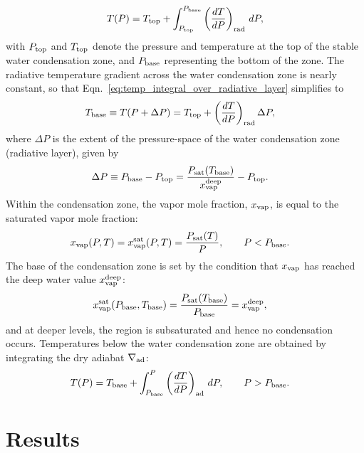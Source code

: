 \documentclass[11pt]{ucscthesisbs}
\begin{document}
\begin{equation}
  T(P) = T_{\rm top} + \int_{P_{\rm top}}^{P_{\rm base}} \left(\frac{dT}{dP}\right)_{\rm rad}\,d P ,
  \label{eq:temp_integral_over_radiative_layer}
\end{equation}
with $P_{\rm top}$ and $T_{\rm top}$ denote the pressure and temperature at the top of the stable water condensation zone, and $P_{\rm base}$ representing the bottom of the zone. The radiative temperature gradient across the water condensation zone is nearly constant, so that Eqn.~\ref{eq:temp_integral_over_radiative_layer} simplifies to
\begin{align}
T_{\rm base}\equiv T(P+\Delta P) &= T_{\rm top} + \left(\frac{dT}{dP}\right)_{\rm rad}\Delta P ,
\label{eq:temperature_profile_over_radiative_layer_simplification}
\end{align}
where $\Delta P$ is the extent of the pressure-space of the water condensation zone (radiative layer), given by
\begin{align}
\Delta P \equiv P_{\rm base}-P_{\rm top} &= \frac{P_{\rm sat}(T_{\rm base})}{x_{\rm vap}^{\rm deep}} - P_{\rm top}.
\label{eq:delta_P_over_radiative_layer}
\end{align}
Within the condensation zone, the vapor mole fraction, $x_{\rm vap}$, is equal to the saturated vapor mole fraction:
\begin{align}
x_{\rm vap}(P, T) &= x_{\rm vap}^{\rm sat}(P, T) = \frac{P_{\rm sat}(T)}{P}, \qquad P<P_{\rm base}.
\label{eq:vapor_mole_fraction_within_condensation_zone}
\end{align}
The base of the condensation zone is set by the condition that $x_{\rm vap}$ has reached the deep water value $x_{\rm vap}^{\rm deep}$:
\begin{align}
x_{\rm vap}^{\rm sat}(P_{\rm base}, T_{\rm base}) &= \frac{P_{\rm sat}(T_{\rm base})}{P_{\rm base}}=x_{\rm vap}^{\rm deep},
\label{eq:cloud_base}
\end{align}
and at deeper levels, the region is subsaturated and hence no condensation occurs. Temperatures below the water condensation zone are obtained by integrating the dry adiabat $\nabla_{\rm ad}$:
\begin{align}
T(P) &= T_{\rm base} + \int_{P_{\rm base}}^P\left(\frac{dT}{dP}\right)_{\rm ad}\,d P, \qquad  P>P_{\rm base} .
\label{eq:dry_adiabat_integration}
\end{align}


\chapter{Results}
\end{document}
